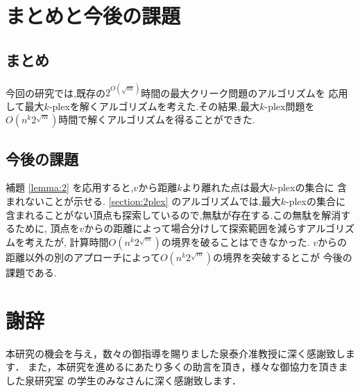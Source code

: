 \documentclass{thesis}
\theoremstyle{definition}
\begin{document}
\chapter{まとめと今後の課題}
\section{まとめ}
今回の研究では,既存の$2^{O(\sqrt{m})}$時間の最大クリーク問題のアルゴリズムを
応用して最大$k$-plexを解くアルゴリズムを考えた.その結果,最大$k$-plex問題を
$O(n^{k}2^{\sqrt{m}})$時間で解くアルゴリズムを得ることができた.

\section{今後の課題}
補題  \ref{lemma:2} を応用すると,$v$から距離$k$より離れた点は最大$k$-plexの集合に
含まれないことが示せる. \ref{section:2plex} のアルゴリズムでは,最大$k$-plexの集合に
含まれることがない頂点も探索しているので,無駄が存在する.この無駄を解消するために,
頂点を$v$からの距離によって場合分けして探索範囲を減らすアルゴリズムを考えたが,
計算時間$O(n^{k}2^{\sqrt{m}})$の境界を破ることはできなかった.
$v$からの距離以外の別のアプローチによって$O(n^{k}2^{\sqrt{m}})$の境界を突破するとこが
今後の課題である.

\newpage

\chapter*{謝辞}
本研究の機会を与え，数々の御指導を賜りました泉泰介准教授に深く感謝致します．
また，本研究を進めるにあたり多くの助言を頂き，様々な御協力を頂きました泉研究室
の学生のみなさんに深く感謝致します．

\newpage


\end{document}
